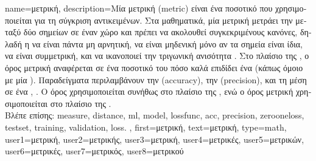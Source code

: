 {name={\foreignlanguage{greek}{μετρική}},
	description={\foreignlanguage{greek}{Μία μετρική} (metric)
		\foreignlanguage{greek}{είναι ένα ποσοτικό}  \foreignlanguage{greek}{που χρησιμοποιείται 
		για τη σύγκριση αντικειμένων. Στα μαθηματικά, μία μετρική μετράει την}  \foreignlanguage{greek}{μεταξύ 
		δύο σημείων σε έναν χώρο και πρέπει να ακολουθεί συγκεκριμένους κανόνες, δηλαδή η}  
		\foreignlanguage{greek}{να είναι πάντα μη αρνητική, να είναι μηδενική μόνο αν τα σημεία είναι ίδια, να είναι συμμετρική, 
		και να ικανοποιεί την τριγωνική ανισότητα} \cite{RudinBookPrinciplesMatheAnalysis}. 
		\foreignlanguage{greek}{Στο πλαίσιο της} , \foreignlanguage{greek}{ο όρος μετρική αναφέρεται 
		σε ένα ποσοτικό}  \foreignlanguage{greek}{του πόσο καλά επιδίδει ένα}  
		\foreignlanguage{greek}{(κάπως όμοιο με μία} ). \foreignlanguage{greek}{Παρα\-δεί\-γματα περιλαμβάνουν 
		την}  (accuracy), \foreignlanguage{greek}{την}  (precision), \foreignlanguage{greek}{και τη μέση} 
		 \foreignlanguage{greek}{σε ένα}  \cite{Goodfellow-et-al-2016}, \cite{BishopBook}. 
		\foreignlanguage{greek}{Ο όρος}  \foreignlanguage{greek}{χρησιμοποι\-εί\-ται συνήθως στο 
		πλαίσιο της}  , \foreignlanguage{greek}{ενώ ο όρος μετρική χρησιμοποιείται 
		στο πλαίσιο της}  .
		\\ 
		\foreignlanguage{greek}{Βλέπε επίσης:} \gls{measure}, \gls{distance}, \gls{ml}, \gls{model}, \gls{lossfunc}, \gls{acc}, \gls{precision}, 
		\gls{zerooneloss}, \gls{testset}, \gls{training}, \gls{validation}, \gls{loss}. },
	first={\foreignlanguage{greek}{μετρική}}, 
	text={\foreignlanguage{greek}{μετρική}},
	type=math,
	user1={\foreignlanguage{greek}{μετρική}}, %
	user2={\foreignlanguage{greek}{μετρικής}}, %
	user3={\foreignlanguage{greek}{μετρική}}, %
	user4={\foreignlanguage{greek}{μετρικές}}, %
	user5={\foreignlanguage{greek}{μετρικών}}, %
	user6={\foreignlanguage{greek}{μετρικές}}, %
	user7={\foreignlanguage{greek}{μετρικός}}, %
	user8={\foreignlanguage{greek}{μετρικού}} %
}

